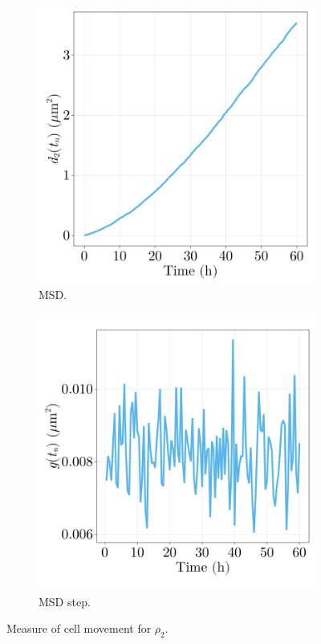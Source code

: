 \begin{figure}[h]
    \centering
    \begin{subfigure}{0.4\textwidth}
        \centering
        \includegraphics[width=\textwidth]{figures/404/404-mse-fp50.png}
        \caption{MSD.}
    \end{subfigure}
    \hspace{4em}
    \begin{subfigure}{0.4\textwidth}
        \centering
        \includegraphics[width=\textwidth]{figures/404/404-mse-step-fp50.png}
        \caption{MSD step.}
    \end{subfigure}
    \caption{Measure of cell movement for $\rho_2$.}
    \label{fig:msd-fp50}
\end{figure}


